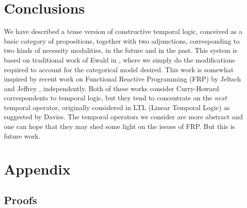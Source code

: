 \documentclass{article}
\begin{document}
\section{Conclusions}
We have described a tense version of constructive temporal logic,
conceived as a basic category of propositions, together with two
adjunctions, corresponding to two kinds of necessity
modalities, in the future and in the past. This system is based on
traditional work of Ewald in \cite{ewald1986}, where we simply do the
modifications required to account for the categorical model
desired. This work is somewhat inspired by recent work on Functional
Reactive Programming (FRP) by Jeltsch \cite{jeltsch2012} and Jeffrey
\cite{jeffrey2012}, independently. Both of these works consider
Curry-Howard correspondents to temporal logic, but they tend to
concentrate on the \textit{next} temporal operator, originally
considered in LTL (Linear Temporal Logic) as suggested by Davies. The
temporal operators we consider are more abstract and one can hope that
they may shed some light on the issues of FRP. But this is future
work.




\appendix

\section{Appendix}
\label{sec:appendix}

\subsection{Proofs}
\label{subsec:proofs}


\end{document}
